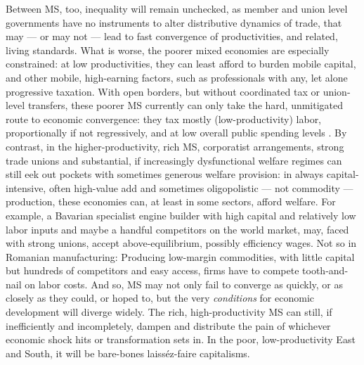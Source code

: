 Between \gls{MS}, too, inequality will remain unchecked, as member and union level governments have no instruments to alter distributive dynamics of trade, that may --- or may not --- lead to fast convergence of productivities, and related, living standards.
What is worse, the poorer mixed economies are especially constrained:
at low productivities, they can least afford to burden mobile capital, and other mobile, high-earning factors, such as professionals with any, let alone progressive taxation.
With open borders, but without coordinated tax or union-level transfers, these poorer \gls{MS} currently can only take the hard, unmitigated route to economic convergence:
they tax mostly (low-productivity) labor, proportionally if not regressively, and at low overall public spending levels \citep[for example,][267]{DaudUngl2008}.
By contrast, in the higher-productivity, rich \gls{MS}, corporatist arrangements, strong trade unions and substantial, if increasingly dysfunctional welfare regimes can still eek out pockets with sometimes generous welfare provision:
in always capital-intensive, often high-value add and sometimes oligopolistic --- not commodity ---production, these economies can, at least in some sectors, afford welfare.
For example, a Bavarian specialist engine builder with high capital and relatively low labor inputs and maybe a handful competitors on the world market,  may, faced with strong unions, accept above-equilibrium, possibly efficiency wages.
Not so in Romanian manufacturing:
Producing low-margin commodities, with little capital but hundreds of competitors and easy access, firms have to compete tooth-and-nail on labor costs.
And so, \gls{MS} may not only fail to converge as quickly, or as closely as they could, or hoped to, but the very \emph{conditions} for economic development will diverge widely.
The rich, high-productivity \gls{MS} can still, if inefficiently and incompletely, dampen and distribute the pain of whichever economic shock hits or transformation sets in.
In the poor, low-productivity East and South, it will be bare-bones laiss\'{e}z-faire capitalisms.
